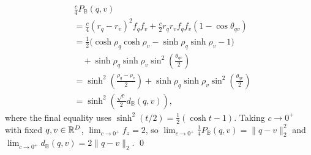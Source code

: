 \begin{equation}
  \begin{aligned}
    &\frac{c}{4}P_{\mathbb{B}}(q, v) \\
    &= \frac{c}{4}(r_q - r_v)^2 f_q f_v
      + \frac{c}{2}r_q r_v f_q f_v (1 - \cos\theta_{qv}) \\
    &= \frac{1}{2}\bigl(\cosh\rho_q\cosh\rho_v - \sinh\rho_q\sinh\rho_v - 1\bigr) \\
    &\quad+ \sinh\rho_q\sinh\rho_v\sin^2\!\left(\frac{\theta_{qv}}{2}\right) \\
    &= \sinh^2\!\left(\frac{\rho_q - \rho_v}{2}\right)
      + \sinh\rho_q\sinh\rho_v\sin^2\!\left(\frac{\theta_{qv}}{2}\right) \\
    &= \sinh^2\!\left(\frac{\sqrt{c}}{2}d_{\mathbb{B}}(q, v)\right),
  \end{aligned}
\end{equation}
where the final equality uses $\sinh^2(t/2) = \frac{1}{2}(\cosh t - 1)$.
Taking $c \to 0^+$ with fixed $q, v \in \mathbb{R}^D$, $\lim_{c \to 0^+} f_z = 2$, so $\lim_{c \to 0^+} \frac{1}{4}P_{\mathbb{B}}(q, v) = \|q - v\|_2^2$ and $\lim_{c \to 0^+} d_{\mathbb{B}}(q, v) = 2\|q - v\|_2$. \qed

